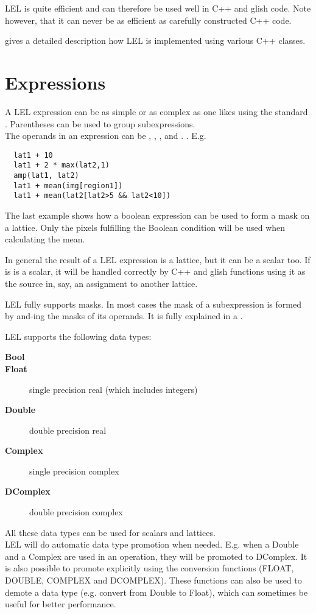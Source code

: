 \medskip\noindent LEL is quite efficient and can therefore be used well
in C++ and glish code.  Note however, that it can never be as efficient as
carefully constructed C++ code. 

\medskip\noindent {} gives a
detailed description how LEL is implemented using various C++ classes. 


\section{\label{LEL:EXPRESSIONS}Expressions}

A LEL expression can be as simple or as complex as one likes
using the standard
.
Parentheses can be used to group subexpressions.
\\The operands in an expression can be
,
,
, and
.
.
E.g.
\begin{verbatim}
  lat1 + 10
  lat1 + 2 * max(lat2,1)
  amp(lat1, lat2)
  lat1 + mean(img[region1])
  lat1 + mean(lat2[lat2>5 && lat2<10])
\end{verbatim}

The last example shows how a boolean expression can be used to form a
mask on a lattice.  Only the pixels fulfilling the Boolean condition
will be used when calculating the mean. 

\medskip\noindent In general the result of a LEL expression is a lattice,
but it can be a scalar too. If is is a scalar, it will be handled correctly
by C++ and glish functions using it as the source in, say, an
assignment to another lattice.

\medskip\noindent LEL fully supports masks. In most cases the mask of a
subexpression is formed by and-ing the masks of its operands.
It is fully explained in a .


\label{LEL:DATATYPES}
LEL supports the following data types:
\begin{description}
  \item[ \textbf{Bool}]
  \item[ \textbf{Float}] single precision real (which includes integers)
  \item[ \textbf{Double}] double precision real
  \item[ \textbf{Complex} ] single precision complex
  \item[ \textbf{DComplex} ] double precision complex
\end{description}
All these data types can be used for scalars and lattices.
\\LEL will do automatic data type promotion when needed. E.g. when
a Double and a Complex are used in an operation, they will be promoted
to DComplex. It is also possible to promote explicitly using the
conversion functions (FLOAT, DOUBLE, COMPLEX and DCOMPLEX).
These functions can also be used to demote a data type
(e.g. convert from Double to Float), which can sometimes
be useful for better performance.

